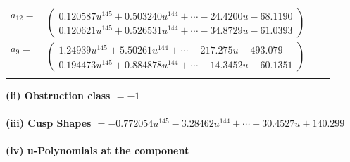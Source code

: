 \documentclass[1p]{elsarticle_modified}
\theoremstyle{definition}
\begin{document}
\begin{tabular}{m{7pt} m{180pt} m{7pt} m{180pt} }
\flushright $a_{12}=$&$\begin{pmatrix}0.120587 u^{145}+0.503240 u^{144}+\cdots-24.4200 u-68.1190\\0.120621 u^{145}+0.526531 u^{144}+\cdots-34.8729 u-61.0393\end{pmatrix}$ \\
\flushright $a_{9}=$&$\begin{pmatrix}1.24939 u^{145}+5.50261 u^{144}+\cdots-217.275 u-493.079\\0.194473 u^{145}+0.884878 u^{144}+\cdots-14.3452 u-60.1351\end{pmatrix}$\\&\end{tabular}
\flushleft \textbf{(ii) Obstruction class $= -1$}\\~\\
\flushleft \textbf{(iii) Cusp Shapes $= -0.772054 u^{145}-3.28462 u^{144}+\cdots-30.4527 u+140.299$}\\~\\
\newpage\renewcommand{\arraystretch}{1}
\flushleft \textbf{(iv) u-Polynomials at the component}\newline \\
\end{document}
